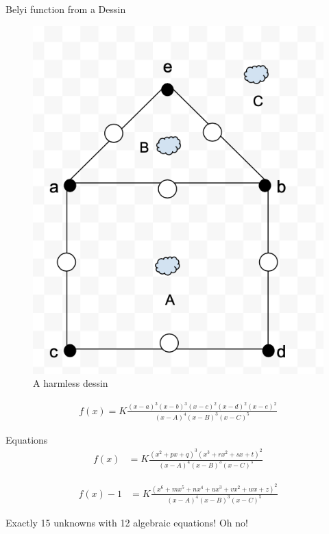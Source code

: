 \documentclass{beamer}
\begin{document}
\begin{frame}{Belyi function from a Dessin}
    \begin{figure}
        \includegraphics[scale=0.5]{images_talk/Belyi_from_dessin.png}
        \caption{\small{A harmless dessin}}
    \end{figure}
    \begin{align*}
        f(x) = K\frac{(x-a)^3(x-b)^3(x-c)^2(x-d)^2(x-e)^2}{(x-A)^4(x-B)^3(x-C)^5}
    \end{align*}
\end{frame}

\begin{frame}{Equations}
    \begin{align*}
        f(x) &= K\frac{(x^2 + px + q)^3(x^3 + rx^2 + sx + t)^2}{(x-A)^4(x-B)^3(x-C)^5}
    \end{align*}
    
    \begin{align*}
        f(x) - 1 &= K\frac{(x^6 + mx^5 + nx^4 + ux^3 + vx^2 + wx + z)^2}{(x-A)^4(x-B)^3(x-C)^5}
    \end{align*}
    
    Exactly 15 unknowns with 12 algebraic equations! Oh no!
\end{frame}
\end{document}

